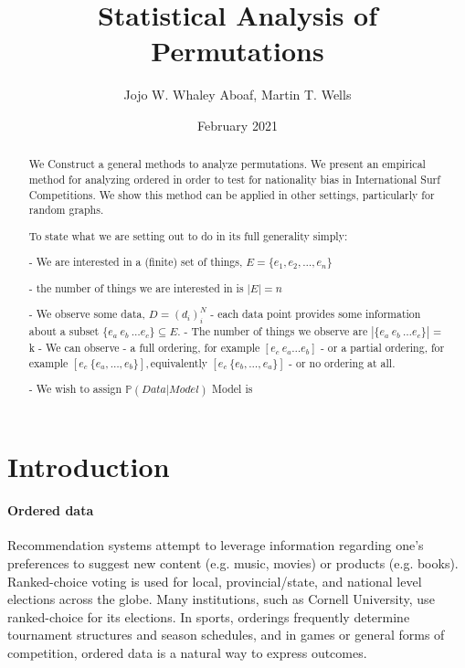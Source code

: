 \documentclass{article}
\title{Statistical Analysis of Permutations}
\author{Jojo W. Whaley Aboaf, Martin T. Wells}
\date{February 2021}
\theoremstyle{definition}
\begin{document}
\maketitle
\tableofcontents

\begin{abstract}
We Construct a general methods to analyze permutations.
We present an empirical method for analyzing ordered in order to test for nationality bias in International Surf Competitions.
We show this method can be applied in other settings, particularly for random graphs.

To state what we are setting out to do in its full generality simply:

- We are interested in a (finite) set of things, $E = \{e_1, e_2, \dots, e_n \} $
	
		- the number of things we are interested in is $|E| = n$

- We observe some data, $D = (d_i)_i^N$
		- each data point provides some information about a subset $ \{ e_a \: e_b \: \dots e_c \} \subseteq E$.
		- The number of things we observe are $|\{ e_a \: e_b \: \dots e_c \} |$ = k
        - We can observe
        	- a full ordering, for example $ [e_c \:  e_a \dots e_b] $
			- or a partial ordering, for example $ [e_c \: \{e_a, \dots, e_b\}], $equivalently $  [e_c \: \{e_b, \dots, e_a\}] $
            - or no ordering at all.
            
- We wish to assign $\mathbb{P}(Data | Model)$
Model  is 

\end{abstract}

\section{Introduction}

\paragraph{Ordered data} Recommendation systems attempt to leverage information regarding one’s preferences to suggest new content (e.g. music, movies) or products (e.g. books). Ranked-choice voting is used for local, provincial/state, and national level elections across the globe. Many institutions, such as Cornell University, use ranked-choice for its elections. In sports, orderings frequently determine tournament structures and season schedules, and in games or general forms of competition, ordered data is a natural way to express outcomes.
\end{document}
